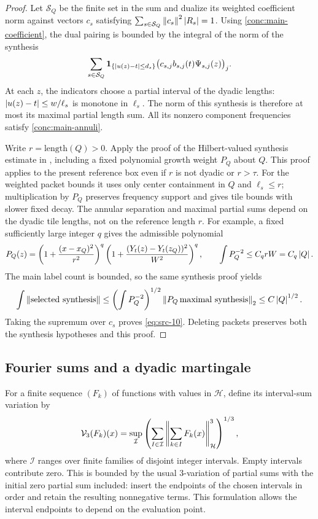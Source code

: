 \begin{proof}
Let $\mathcal S_Q$ be the finite set in the sum and dualize its weighted
coefficient norm against vectors $c_s$ satisfying
$\sum_{s\in\mathcal S_Q}\left\|c_s\right\|^2\left|R_s\right|=1$.
Using \eqref{conc:main-coefficient}, the dual pairing is bounded by the
integral of the norm of the synthesis
\[
 \sum_{s\in\mathcal S_Q}
   \mathbf 1_{\{\left|u(z)-t\right|\leq d_s\}}
   \big(c_{s,j}b_{s,j}(t)\Psi_{s,j}(z)\big)_j.
\]
At each $z$, the indicators choose a partial interval of the dyadic
lengths: $\left|u(z)-t\right|\leq w/\ell_s$ is monotone in $\ell_s$.
The norm of this synthesis is therefore at most its maximal partial
length sum.  All its nonzero component frequencies satisfy
\eqref{conc:main-annuli}.

Write $r=\mathrm{length}(Q)>0$.  Apply the proof of the Hilbert-valued
synthesis estimate in , including a fixed
polynomial growth weight $P_Q$ about $Q$.  This proof applies to the
present reference box even if $r$ is not dyadic or $r>\tau$.
For the weighted packet bounds it uses only center containment in $Q$
and $\ell_s\leq r$; multiplication by $P_Q$ preserves frequency support
and gives tile bounds with slower fixed decay.  The annular separation
and maximal partial sums depend on the dyadic tile lengths, not on the
reference length $r$.  For example, a fixed sufficiently large integer
$q$ gives the admissible polynomial
\[
 P_Q(z)=\left(1+\frac{(x-x_Q)^2}{r^2}\right)^q
        \left(1+\frac{(Y_t(z)-Y_t(z_Q))^2}{W^2}\right)^q,
 \qquad \int P_Q^{-2}\leq C_q rW=C_q\left|Q\right|.
\]
The main label count is bounded, so the same synthesis proof yields
\[
 \int\left\|\text{selected synthesis}\right\|
 \leq \left(\int P_Q^{-2}\right)^{1/2}
       \left\|P_Q\,\text{maximal synthesis}\right\|_2
 \leq C\left|Q\right|^{1/2}.
\]
Taking the supremum over $c_s$ proves \eqref{eq:src-10}.
Deleting packets preserves both the synthesis hypotheses and this
proof.
\end{proof}

\subsection{Fourier sums and a dyadic martingale}

For a finite sequence $(F_k)$ of functions with values in $\mathcal H$,
define its interval-sum variation by
\begin{equation}\label{conc:variation-definition}
 \mathcal V_3(F_k)(x)
 =\sup_{\mathcal I}
 \left(\sum_{I\in\mathcal I}
          \left\|\sum_{k\in I}F_k(x)\right\|_{\mathcal H}^{3}\right)^{1/3},
\end{equation}
where $\mathcal I$ ranges over finite families of disjoint integer
intervals.  Empty intervals contribute zero.  This is bounded by the
usual $3$-variation of partial sums with the initial zero partial sum
included: insert the endpoints of the chosen intervals in order and
retain the resulting nonnegative terms.  This formulation allows the
interval endpoints to depend on the evaluation point.

